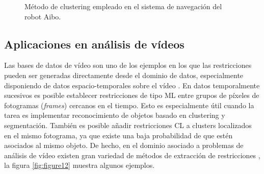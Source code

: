 \begin{figure}[bth]
	\myfloatalign
	 \quad
	 \quad
	 \quad
	\caption[Método de clustering empleado en el sistema de navegación del robot Aibo.]{Método de clustering empleado en el sistema de navegación del robot Aibo. \cite{Survey:2007}\cite{DavidsonRavi:2005a}}\label{fig:figure11}
\end{figure}

\subsection{Aplicaciones en análisis de vídeos}

Las bases de datos de vídeo son uno de los ejemplos en los que las restricciones pueden ser generadas directamente desde el dominio de datos, especialmente disponiendo de datos espacio-temporales sobre el vídeo \cite{Yan:2006}. En datos temporalmente sucesivos es posible establecer restricciones de tipo \acf{ML} entre grupos de píxeles de fotogramas (\textit{frames}) cercanos en el tiempo. Esto es especialmente útil cuando la tarea es implementar reconocimiento de objetos basado en clustering y segmentación. También es posible añadir restricciones \acf{CL} a clusters localizados en el mismo fotograma, ya que existe una baja probabilidad de que estén asociados al mismo objeto. De hecho, en el dominio asociado a problemas de análisis de vídeo existen gran variedad de métodos de extracción de restricciones \cite{Yan:2006}, la figura \ref{fig:figure12} muestra algunos ejemplos.  

